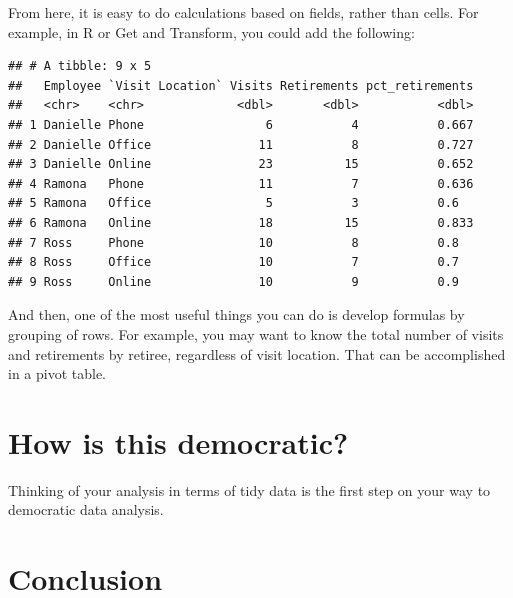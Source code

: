 \documentclass[]{book}
\newenvironment{Shaded}{\begin{snugshade}}{\end{snugshade}}
\newcommand{\DataTypeTok}[1]{\textcolor[rgb]{0.13,0.29,0.53}{#1}}
\newcommand{\KeywordTok}[1]{\textcolor[rgb]{0.13,0.29,0.53}{\textbf{#1}}}
\newcommand{\NormalTok}[1]{#1}
\newcommand{\OperatorTok}[1]{\textcolor[rgb]{0.81,0.36,0.00}{\textbf{#1}}}
\newcommand{\StringTok}[1]{\textcolor[rgb]{0.31,0.60,0.02}{#1}}
\begin{document}
From here, it is easy to do calculations based on fields, rather than cells. For example, in R or Get and Transform, you could add the following:

\begin{Shaded}
\end{Shaded}

\begin{verbatim}
## # A tibble: 9 x 5
##   Employee `Visit Location` Visits Retirements pct_retirements
##   <chr>    <chr>             <dbl>       <dbl>           <dbl>
## 1 Danielle Phone                 6           4           0.667
## 2 Danielle Office               11           8           0.727
## 3 Danielle Online               23          15           0.652
## 4 Ramona   Phone                11           7           0.636
## 5 Ramona   Office                5           3           0.6  
## 6 Ramona   Online               18          15           0.833
## 7 Ross     Phone                10           8           0.8  
## 8 Ross     Office               10           7           0.7  
## 9 Ross     Online               10           9           0.9
\end{verbatim}

And then, one of the most useful things you can do is develop formulas by grouping of rows. For example, you may want to know the total number of visits and retirements by retiree, regardless of visit location. That can be accomplished in a pivot table.

\hypertarget{how-is-this-democratic}{%
\section{How is this democratic?}\label{how-is-this-democratic}}

Thinking of your analysis in terms of tidy data is the first step on your way to democratic data analysis.

\hypertarget{conclusion}{%
\section{Conclusion}\label{conclusion}}
\end{document}
